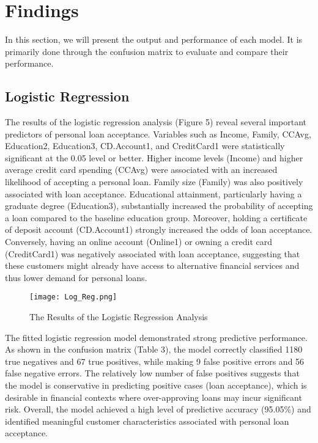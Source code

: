 \documentclass[12pt]{article}
\begin{document}
\section{Findings}
In this section, we will present the output and performance of each model. It is primarily done through the confusion matrix to evaluate and compare their performance.
\subsection{Logistic Regression}
The results of the logistic regression analysis (Figure 5) reveal several important predictors of personal loan acceptance. Variables such as Income, Family, CCAvg, Education2, Education3, CD.Account1, and CreditCard1 were statistically significant at the 0.05 level or better. Higher income levels (Income) and higher average credit card spending (CCAvg) were associated with an increased likelihood of accepting a personal loan. Family size (Family) was also positively associated with loan acceptance. Educational attainment, particularly having a graduate degree (Education3), substantially increased the probability of accepting a loan compared to the baseline education group. Moreover, holding a certificate of deposit account (CD.Account1) strongly increased the odds of loan acceptance. Conversely, having an online account (Online1) or owning a credit card (CreditCard1) was negatively associated with loan acceptance, suggesting that these customers might already have access to alternative financial services and thus lower demand for personal loans.
\begin{figure}
    \centering
    \texttt{[image: Log\_Reg.png]}
    \caption{The Results of the Logistic Regression Analysis}
    \label{fig:enter-label}
\end{figure}

The fitted logistic regression model demonstrated strong predictive performance. As shown in the confusion matrix (Table 3), the model correctly classified 1180 true negatives and 67 true positives, while making 9 false positive errors and 56 false negative errors. The relatively low number of false positives suggests that the model is conservative in predicting positive cases (loan acceptance), which is desirable in financial contexts where over-approving loans may incur significant risk. Overall, the model achieved a high level of predictive accuracy (95.05\%) and identified meaningful customer characteristics associated with personal loan acceptance.
\end{document}
